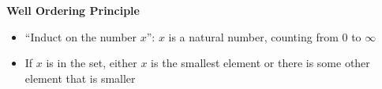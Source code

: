 \item \textbf{Well Ordering Principle}
\begin{itemize}
\item “Induct on the number $x$”: $x$ is a natural number, counting from 0 
to $\infty$
\item If $x$ is in the set, either $x$ is the smallest element or there is some 
other element that is smaller
\end{itemize}